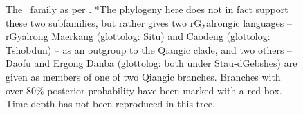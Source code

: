 \begin{figure}
  \centering
  \label{f:Methods:Zhang2019}
  \caption{The \lfam\ family as per . *The phylogeny here does not in fact support these two subfamilies, but rather gives two rGyalrongic languages -- rGyalrong Maerkang (glottolog: Situ) and Caodeng (glottolog: Tshobdun) -- as an outgroup to the Qiangic clade, and two others -- Daofu and Ergong Danba (glottolog: both under Stau-dGebshes) are given as members of one of two Qiangic branches. Branches with over 80\% posterior probability have been marked with a red box. Time depth has not been reproduced in this tree.}
  \end{figure}

